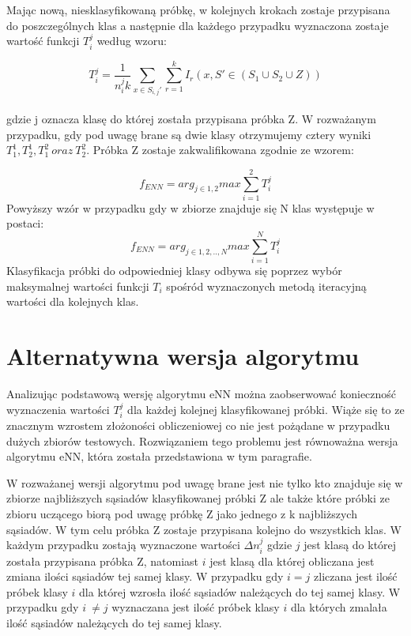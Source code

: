 Mając nową, niesklasyfikowaną próbkę, w kolejnych krokach zostaje przypisana do poszczególnych klas a następnie dla każdego przypadku wyznaczona zostaje wartość funkcji $T_i^j$ według wzoru:

\begin{equation}
T_{i}^{j} = \frac{1}{n_i^j k} {\sum_{x \in S_{i,j}'} \sum_{r=1}^{k} I_r (x,S' \in (S_1 \cup S_2 \cup {Z}))} 
\end{equation}\\
gdzie j oznacza klasę do której została przypisana próbka Z.
W rozważanym przypadku, gdy pod uwagę brane są dwie klasy otrzymujemy cztery wyniki $T_1^1, T_2^1, T_1^2\ oraz\ T_2^2$. Próbka Z zostaje zakwalifikowana zgodnie ze wzorem:

\begin{equation}
f_{ENN} = arg_{j\in1,2} max \sum_{i=1}^{2} T_i^j
\end{equation}
Powyższy wzór w przypadku gdy w zbiorze znajduje się N klas występuje w postaci:
\begin{equation}
f_{ENN} = arg_{j\in1,2,..,N} max \sum_{i=1}^{N} T_i^j
\end{equation}
Klasyfikacja próbki do odpowiedniej klasy odbywa się poprzez wybór maksymalnej wartości funkcji $T_i$ spośród wyznaczonych metodą iteracyjną wartości dla kolejnych klas.

\newpage
\section{Alternatywna wersja algorytmu}
Analizując podstawową wersję algorytmu eNN można zaobserwować konieczność wyznaczenia wartości $T_i^j$ dla każdej kolejnej klasyfikowanej próbki. Wiąże się to  ze znacznym wzrostem złożoności obliczeniowej co nie jest pożądane w przypadku dużych zbiorów testowych. Rozwiązaniem tego problemu jest równoważna wersja algorytmu eNN, która została przedstawiona w tym paragrafie. 

W rozważanej wersji algorytmu pod uwagę brane jest nie tylko kto znajduje się w zbiorze najbliższych sąsiadów klasyfikowanej próbki Z ale także które próbki ze zbioru uczącego biorą pod uwagę próbkę Z jako jednego z k najbliższych sąsiadów. W tym celu próbka Z zostaje przypisana kolejno do wszystkich klas. W każdym przypadku zostają wyznaczone wartości $\Delta n_i^j$ gdzie $j$ jest klasą do której została przypisana próbka Z, natomiast $i$ jest klasą dla której obliczana jest zmiana ilości sąsiadów tej samej klasy. W przypadku gdy $i = j$ zliczana jest ilość próbek klasy $i$ dla której wzrosła ilość sąsiadów należących do tej samej klasy. W przypadku gdy $i\ \neq j$ wyznaczana jest ilość próbek klasy $i$ dla których zmalała ilość sąsiadów należących do tej samej klasy.

